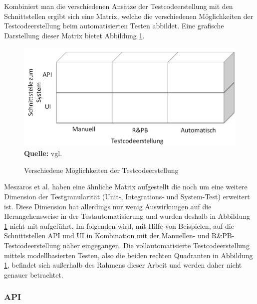 Kombiniert man die verschiedenen Ansätze der Testcodeerstellung mit den Schnittstellen ergibt sich eine Matrix, welche die verschiedenen Möglichkeiten der Testcodeerstellung beim automatisierten Testen abbildet. Eine grafische Darstellung dieser Matrix bietet Abbildung \ref{fig:bereicheTestcodeerstellung}.


\begin{figure}[htb]
  \centering  
  \includegraphics[scale=0.7]{img/bereicheTestcodeerstellung.png}\\
  \footnotesize\sffamily\textbf{Quelle:} vgl. \cite{meszaros_agile_2003}
  \caption{Verschiedene Möglichkeiten der Testcodeerstellung}
  \label{fig:bereicheTestcodeerstellung}
\end{figure}

Meszaros et al. \cite{meszaros_agile_2003} haben eine ähnliche Matrix aufgestellt die noch um eine weitere Dimension der Testgranularität (Unit-, Integrations- und System-Test) erweitert ist. Diese Dimension hat allerdings nur wenig Auswirkungen auf die Herangehensweise in der Testautomatisierung und wurden deshalb in Abbildung \ref{fig:bereicheTestcodeerstellung} nicht mit aufgeführt.
Im folgenden wird,  mit Hilfe von Beispielen, auf die Schnittstellen API und UI in Kombination mit der Manuellen- und R\&PB-Testcodeerstellung näher eingegangen.
Die vollautomatisierte Testcodeerstellung mittels modellbasierten Testen, also die beiden rechten Quadranten in Abbildung \ref{fig:bereicheTestcodeerstellung}, befindet sich außerhalb des Rahmens dieser Arbeit und werden daher nicht genauer betrachtet.

\subsubsection{API}
\label{subsubsec:API}

